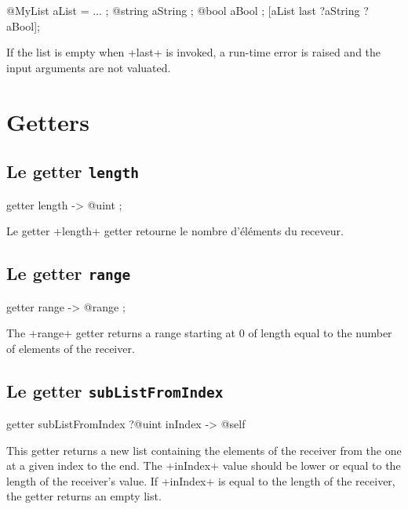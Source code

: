 \begin{galgas}
@MyList aList = ... ;
@string aString ;
@bool aBool ;
[aList last ?aString ?aBool];
\end{galgas}


If the list is empty when \ggs+last+ is invoked, a run-time error is raised and the input arguments are not valuated.








\section{Getters}

\subsection{Le getter \texttt{length}}

\begin{galgas}
getter length -> @uint ;
\end{galgas}

Le getter \ggs+length+ getter retourne le nombre d'éléments du receveur.


\subsection{Le getter \texttt{range}}

\begin{galgas}
getter range -> @range ;
\end{galgas}

The \ggs+range+ getter returns a range starting at $0$ of length equal to the number of elements of the receiver.




\subsection{Le getter \texttt{subListFromIndex}}

\begin{galgas}
getter subListFromIndex ?@uint inIndex -> @self
\end{galgas}

This getter returns a new list containing the elements of the receiver from the one at a given index to the end. The  \ggs+inIndex+ value should be lower or equal to the length of the receiver's value. If \ggs+inIndex+ is equal to the length of the receiver, the getter returns an empty list.


